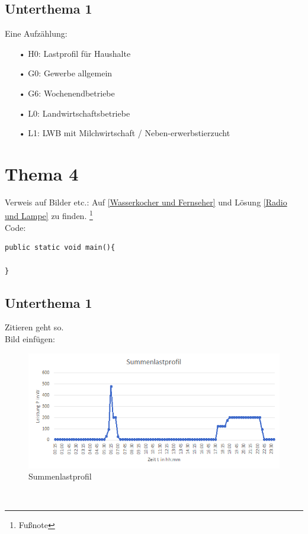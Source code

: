 \documentclass[12pt,a4paper]{scrartcl}
\begin{document}
\subsection{Unterthema 1}
Eine Aufzählung:\\
\begin{enumerate}
\item[•]H0: Lastprofil für Haushalte
\item[•]G0: Gewerbe allgemein
\item[•]G6: Wochenendbetriebe
\item[•]L0: Landwirtschaftsbetriebe 
\item[•]L1: LWB mit Milchwirtschaft / Neben-erwerbstierzucht
\end{enumerate}

\newpage
\section{Thema 4}
Verweis auf Bilder etc.: Auf \ref{Wasserkocher und Fernseher} und Lösung \ref{Radio und Lampe} zu finden. \footnote{Fußnote}\\
Code:
\begin{lstlisting}
public static void main(){
	
}
\end{lstlisting}
\subsection{Unterthema 1}
Zitieren geht so. \cite{Test1}\\
Bild einfügen:
\begin{figure}[h]
 \centering
 \includegraphics[width=13cm]{src/tabelle1.png}
 \caption{Summenlastprofil}
\end{figure}\\
\newpage
	\setcounter{page}{4}
	
	{}
\end{document}
